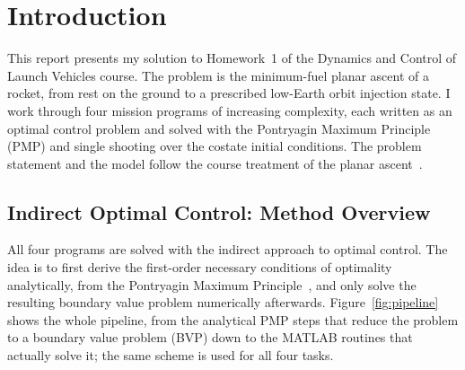 \documentclass[../main.tex]{subfiles}
\begin{document}
\section{Introduction}\label{sec:introduction}

This report presents my solution to Homework~1 of the Dynamics and Control of Launch Vehicles course. The problem is the minimum-fuel planar ascent of a rocket, from rest on the ground to a prescribed low-Earth orbit injection state. I work through four mission programs of increasing complexity, each written as an optimal control problem and solved with the Pontryagin Maximum Principle (PMP) and single shooting over the costate initial conditions. The problem statement and the model follow the course treatment of the planar ascent~\cite[HW1]{dclvnotes}.

\subsection{Indirect Optimal Control: Method Overview}\label{sec:method}

All four programs are solved with the indirect approach to optimal control. The idea is to first derive the first-order necessary conditions of optimality analytically, from the Pontryagin Maximum Principle~\cite{pontryagin1962}, and only solve the resulting boundary value problem numerically afterwards. Figure~\ref{fig:pipeline} shows the whole pipeline, from the analytical PMP steps that reduce the problem to a boundary value problem (BVP) down to the MATLAB routines that actually solve it; the same scheme is used for all four tasks.
\end{document}
